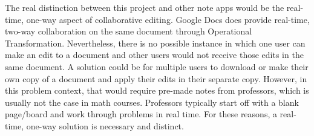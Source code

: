 \documentclass[10pt,twocolumn]{article}
\begin{document}
The real distinction between this project and other note apps would be the real-time, one-way aspect of collaborative editing. Google Docs does provide real-time, two-way collaboration on the same document through Operational Transformation. Nevertheless, there is no possible instance in which one user can make an edit to a document and other users would not receive those edits in the same document. A solution could be for multiple users to download or make their own copy of a document and apply their edits in their separate copy. However, in this problem context, that would require pre-made notes from professors, which is usually not the case in math courses. Professors typically start off with a blank page/board and work through problems in real time. For these reasons, a real-time, one-way solution is necessary and distinct. 

\printbibliography
\end{document}
